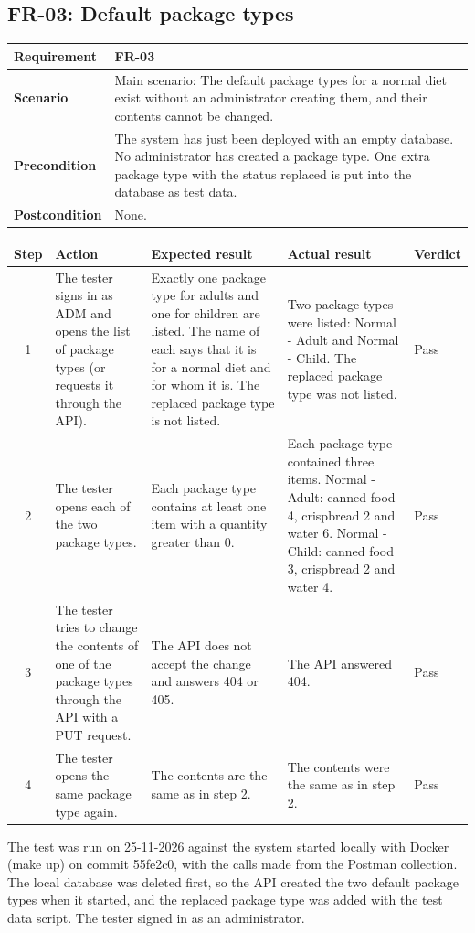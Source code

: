 \documentclass[a4paper,11pt]{article}
\newcommand{\scenarioinfo}[4]{%
  \noindent\begin{tabular}{|p{3cm}|p{12cm}|}
  \hline
  \textbf{Requirement} & \textbf{#1} \\
  \hline
  \textbf{Scenario} & #2 \\
  \hline
  \textbf{Precondition} & #3 \\
  \hline
  \textbf{Postcondition} & #4 \\
  \hline
  \end{tabular}\par\medskip}
\newenvironment{steps}{%
  \noindent\footnotesize
  \begin{tabular}{|c|p{3.6cm}|p{4.6cm}|p{3.2cm}|p{1.5cm}|}
  \hline
  \textbf{Step} & \textbf{Action} & \textbf{Expected result} & \textbf{Actual result} & \textbf{Verdict} \\
  \hline
}{%
  \end{tabular}\par\bigskip
}
\begin{document}
\subsection{FR-03: Default package types}
\scenarioinfo{FR-03}
  {Main scenario: The default package types for a normal diet exist without an administrator creating them, and their contents cannot be changed.}
  {The system has just been deployed with an empty database. No administrator has created a package type. One extra package type with the status replaced is put into the database as test data.}
  {None.}
\begin{steps}
1 & The tester signs in as ADM and opens the list of package types (or requests it through the API). & Exactly one package type for adults and one for children are listed. The name of each says that it is for a normal diet and for whom it is. The replaced package type is not listed. & Two package types were listed: Normal - Adult and Normal - Child. The replaced package type was not listed. & Pass \\
\hline
2 & The tester opens each of the two package types. & Each package type contains at least one item with a quantity greater than 0. & Each package type contained three items. Normal - Adult: canned food 4, crispbread 2 and water 6. Normal - Child: canned food 3, crispbread 2 and water 4. & Pass \\
\hline
3 & The tester tries to change the contents of one of the package types through the API with a PUT request. & The API does not accept the change and answers 404 or 405. & The API answered 404. & Pass \\
\hline
4 & The tester opens the same package type again. & The contents are the same as in step 2. & The contents were the same as in step 2. & Pass \\
\hline
\end{steps}

The test was run on 25-11-2026 against the system started locally with Docker (make up) on commit 55fe2c0, with the calls made from the Postman collection. The local database was deleted first, so the API created the two default package types when it started, and the replaced package type was added with the test data script. The tester signed in as an administrator.
\end{document}
